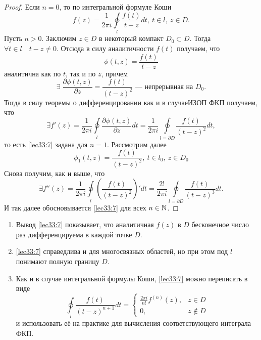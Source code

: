 \documentclass[../../main.tex]{subfiles}
\begin{document}
\begin{proof}
	Если $n=0$, то по интегральной формуле Коши
	\[
	f(z) = \frac{1}{2\pi i} \oint \limits_l
	\frac{f(t)}{t-z} dt,\ t \in l,\ z \in D.
	\]
	Пусть $n > 0$.
	Заключим $z \in D$ в некоторый компакт $D_0 \subset D$. Тогда
	$\forall t \in l\quad t - z \neq 0.$
	Отсюда в силу аналитичности $f(t)$ получаем, что
	\begin{equation}
	\label{lec33:9}
	\phi(t, z) = \frac{f(t)}{t-z} 
	\end{equation}
	аналитична как по $t$, так и по $z$, причем
	\[
	\exists\; \frac{\partial \phi(t, z)}{\partial z}
	= \frac{f(t)}{(t-z)^2}
	\text{~--- непрерывная на } D_0.
	\]
	Тогда в силу теоремы о дифференцировании как и в случаеИЗОП ФКП
	получаем, что 
	\begin{equation}
	\label{lec33:10}
	\exists f'(z) = \frac{1}{2\pi i} \oint\limits_{l}
	\frac{\partial \phi(t, z)}{\partial z} dt = 
	\frac{1}{2\pi i} \oint\limits_{l = \partial D}\frac{f(t)}{(t-z)^2} 
	dt,
	\end{equation}
	то есть \eqref{lec33:7} задана для $n = 1$.
	Рассмотрим далее 
	\[
	\phi_1(t, z) = \frac{f(t)}{(t-z)^2},\ t \in l_0, \
	z \in D_0
	\]
	Снова получим, как и выше, что 
	\[
	\exists f''(z) = \frac{1}{2\pi i} \oint\limits_{l}
	\left( \frac{f(t)}{(t-z)^2} \right)' dt =
	\frac{2!}{2\pi i} \oint\limits_{l = \partial D}
	\frac{f(t)}{(t-z)^3} dt.
	\]
	И так далее обосновывается \eqref{lec33:7} для всех $n \in \mathbb{N}$.
\end{proof}
\begin{rems}

\;

\begin{enumerate}
	\item Вывод \eqref{lec33:7} показывает, что аналитичная $f(z)$ в 
	$D$ бесконечное число раз дифференцируема в каждой точке
	$D$.
	\item \eqref{lec33:7} справедлива и для многосвязных
	областей, но при этом под $l$ понимают полную границу $D$.
	
	\item Как и в случае интегральной формулы Коши, 
	\eqref{lec33:7} можно переписать в виде 
	\[
	\oint\limits_l \frac{f(t)}{(t-z)^{n+1}} dt = 
	\begin{cases}
	\frac{2\pi i}{n!} f^{(n)}(z),& z \in D \\
	0,& z \notin D
	\end{cases}
	\]
	и использовать её на практике для вычисления
	соответствующего интеграла ФКП.
\end{enumerate}

\end{rems}
\end{document}
